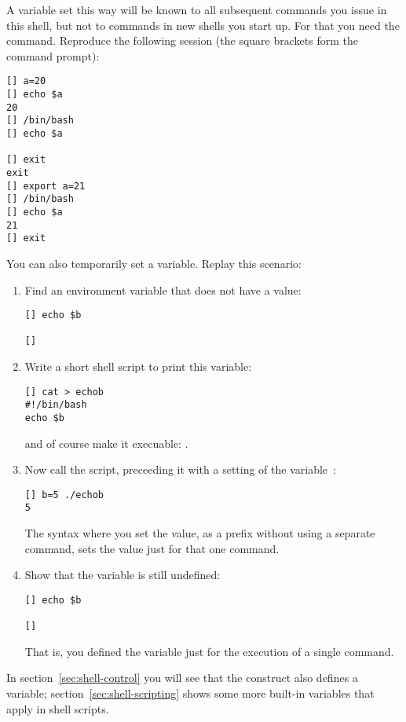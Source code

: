
A variable set this way will be known to all subsequent commands
you issue in this shell, but not to commands in new shells you start up.
For that you need the  command.
Reproduce the following session (the square brackets form the command prompt):
\begin{verbatim}
[] a=20
[] echo $a
20
[] /bin/bash
[] echo $a

[] exit
exit
[] export a=21
[] /bin/bash
[] echo $a
21
[] exit
\end{verbatim}

You can also temporarily set a variable. Replay this scenario:
\begin{enumerate}
\item Find an environment variable that does not have a value:
\begin{verbatim}
[] echo $b

[]
\end{verbatim}
\item Write a short shell script to print this variable:
\begin{verbatim}
[] cat > echob
#!/bin/bash
echo $b
\end{verbatim}
and of course make it execuable: .
\item Now call the script, preceeding it with a setting of the variable~:
\begin{verbatim}
[] b=5 ./echob
5
\end{verbatim}
The syntax where you set the value, as a prefix without using a separate
command, sets the value just for that one command.
\item Show that the variable is still undefined:
\begin{verbatim}
[] echo $b

[]
\end{verbatim}
That is, you defined the variable just for the execution of a single command.
\end{enumerate}

In  section~\ref{sec:shell-control} you will see that the  construct
also defines a variable; section~\ref{sec:shell-scripting}
shows some more built-in variables that apply in shell scripts.

